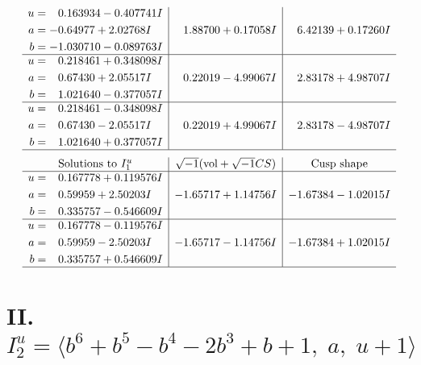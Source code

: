 \documentclass[1p]{elsarticle_modified}
\theoremstyle{definition}
\newcommand{\I}{\sqrt{-1}}
\begin{document}
$$\begin{array}{c|c|c}
\begin{aligned}
u &= \phantom{-}0.163934 - 0.407741 I \\
a &= -0.64977 + 2.02768 I \\
b &= -1.030710 - 0.089763 I\end{aligned}
 & \phantom{-}1.88700 + 0.17058 I & \phantom{-}6.42139 + 0.17260 I \\ \hline\begin{aligned}
u &= \phantom{-}0.218461 + 0.348098 I \\
a &= \phantom{-}0.67430 + 2.05517 I \\
b &= \phantom{-}1.021640 - 0.377057 I\end{aligned}
 & \phantom{-}0.22019 - 4.99067 I & \phantom{-}2.83178 + 4.98707 I \\ \hline\begin{aligned}
u &= \phantom{-}0.218461 - 0.348098 I \\
a &= \phantom{-}0.67430 - 2.05517 I \\
b &= \phantom{-}1.021640 + 0.377057 I\end{aligned}
 & \phantom{-}0.22019 + 4.99067 I & \phantom{-}2.83178 - 4.98707 I\\
 \hline 
 \end{array}$$\newpage$$\begin{array}{c|c|c}  
\text{Solutions to }I^u_{1}& \I (\text{vol} + \sqrt{-1}CS) & \text{Cusp shape}\\
 \hline 
\begin{aligned}
u &= \phantom{-}0.167778 + 0.119576 I \\
a &= \phantom{-}0.59959 + 2.50203 I \\
b &= \phantom{-}0.335757 - 0.546609 I\end{aligned}
 & -1.65717 + 1.14756 I & -1.67384 - 1.02015 I \\ \hline\begin{aligned}
u &= \phantom{-}0.167778 - 0.119576 I \\
a &= \phantom{-}0.59959 - 2.50203 I \\
b &= \phantom{-}0.335757 + 0.546609 I\end{aligned}
 & -1.65717 - 1.14756 I & -1.67384 + 1.02015 I\\
 \hline 
 \end{array}$$\newpage\newpage\renewcommand{\arraystretch}{1}
\centering \section*{II. $I^u_{2}= \langle b^6+b^5- b^4-2 b^3+b+1,\;a,\;u+1 \rangle$}
\end{document}
